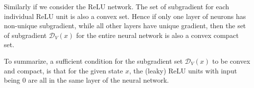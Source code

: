 \documentclass{article}
\begin{document}
Similarly if we consider the ReLU network. The set of subgradient for each individual ReLU unit is also a convex set. Hence if only one layer of neurons has non-unique subgradient, while all other layers have unique gradient, then the set of subgradient $\mathcal{D}_V(x)$ for the entire neural network is also a convex compact set.

To summarize, a sufficient condition for the subgradient set $\mathcal{D}_V(x)$ to be convex and compact, is that for the given state $x$, the (leaky) ReLU units with input being 0 are all in the same layer of the neural network.
\end{document}
